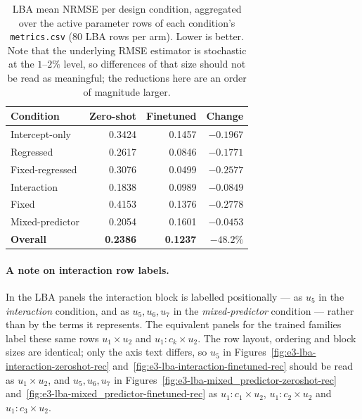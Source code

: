 \begin{table}[htbp]
  \centering
  \small
  \begin{tabular}{@{}lrrr@{}}
    \toprule
    Condition & Zero-shot & Finetuned & Change \\
    \midrule
    Intercept-only   & 0.3424 & 0.1457 & $-0.1967$ \\
    Regressed        & 0.2617 & 0.0846 & $-0.1771$ \\
    Fixed-regressed  & 0.3076 & 0.0499 & $-0.2577$ \\
    Interaction      & 0.1838 & 0.0989 & $-0.0849$ \\
    Fixed            & 0.4153 & 0.1376 & $-0.2778$ \\
    Mixed-predictor  & 0.2054 & 0.1601 & $-0.0453$ \\
    \midrule
    \textbf{Overall} & \textbf{0.2386} & \textbf{0.1237} & $\mathbf{-48.2\%}$ \\
    \bottomrule
  \end{tabular}
  \caption{LBA mean NRMSE per design condition, aggregated over the active
    parameter rows of each condition's \texttt{metrics.csv} (80 LBA rows per
    arm). Lower is better. Note that the underlying RMSE estimator is
    stochastic at the $1$--$2\%$ level, so differences of that size should not
    be read as meaningful; the reductions here are an order of magnitude
    larger.}
  \label{tab:e3-lba-nrmse}
\end{table}

\paragraph{A note on interaction row labels.}
In the LBA panels the interaction block is labelled positionally --- as $u_5$
in the \emph{interaction} condition, and as $u_5, u_6, u_7$ in the
\emph{mixed-predictor} condition --- rather than by the terms it represents.
The equivalent panels for the trained families label these same rows
$u_1 \times u_2$ and $u_1{:}c_k \times u_2$. The row layout, ordering and block
sizes are identical; only the axis text differs, so $u_5$ in
Figures~\ref{fig:e3-lba-interaction-zeroshot-rec}
and~\ref{fig:e3-lba-interaction-finetuned-rec} should be read as
$u_1 \times u_2$, and $u_5, u_6, u_7$ in
Figures~\ref{fig:e3-lba-mixed_predictor-zeroshot-rec}
and~\ref{fig:e3-lba-mixed_predictor-finetuned-rec} as
$u_1{:}c_1 \times u_2$, $u_1{:}c_2 \times u_2$ and $u_1{:}c_3 \times u_2$.

\FloatBarrier
\clearpage

